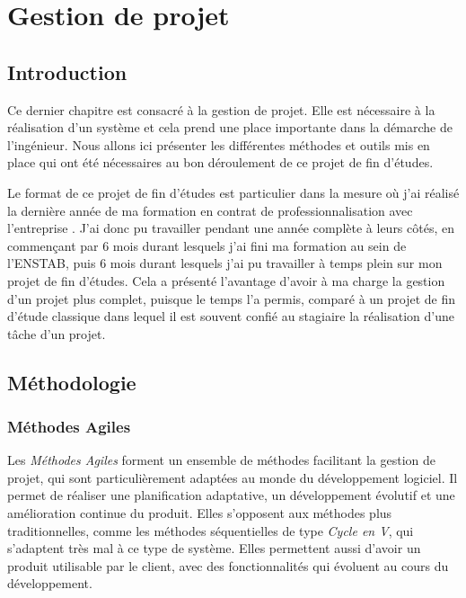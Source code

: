 \chapter{Gestion de projet}
\label{chapter:projet}
	
	\section{Introduction}

		Ce dernier chapitre est consacré à la gestion de projet. Elle est nécessaire à la réalisation d'un système et cela prend une place importante dans la démarche de l'ingénieur. Nous allons ici présenter les différentes méthodes et outils mis en place qui ont été nécessaires au bon déroulement de ce projet de fin d'études.

		Le format de ce projet de fin d'études est particulier dans la mesure où j'ai réalisé la dernière année de ma formation en contrat de professionnalisation avec l'entreprise \forssea{}. J'ai donc pu travailler pendant une année complète à leurs côtés, en commençant par 6 mois durant lesquels j'ai fini ma formation au sein de l'\gls{ENSTAB}, puis 6 mois durant lesquels j'ai pu travailler à temps plein sur mon projet de fin d'études. Cela a présenté l'avantage d'avoir à ma charge la gestion d'un projet plus complet, puisque le temps l'a permis, comparé à un projet de fin d'étude classique dans lequel il est souvent confié au stagiaire la réalisation d'une tâche d'un projet.

	\section{Méthodologie}

		\subsection{Méthodes Agiles}
			Les \textit{Méthodes Agiles} forment un ensemble de méthodes facilitant la gestion de projet, qui sont particulièrement adaptées au monde du développement logiciel. Il permet de réaliser une planification adaptative, un développement évolutif et une amélioration continue du produit. Elles s'opposent aux méthodes plus traditionnelles, comme les méthodes séquentielles de type \textit{Cycle en V}, qui s'adaptent très mal à ce type de système. Elles permettent aussi d'avoir un produit utilisable par le client, avec des fonctionnalités qui évoluent au cours du développement.

